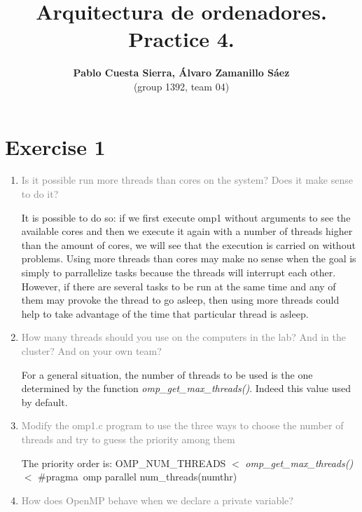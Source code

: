 \documentclass{article}
\begin{document}
\title{\textbf{Arquitectura de ordenadores. Practice 4.}}
\author{\textbf{Pablo Cuesta Sierra, Álvaro Zamanillo Sáez}\\(group 1392, team 04)}
\maketitle

\begin{tcolorbox}
\tableofcontents
\end{tcolorbox}


\newpage
\section{Exercise 1}

\begin{enumerate}
\item \textcolor{gray}{Is it possible run more threads than cores on the system? Does it make sense to do it?}

It is possible to do so: if we first execute omp1 without arguments to see the available cores and then we execute it again with a number of threads higher than the amount of cores, we will see that the execution is carried on without problems. Using more threads than cores may make no sense when the goal is simply to parrallelize tasks because the threads will interrupt each other. However, if there are several tasks to be run at the same time and any of them may provoke the thread to go asleep, then using more threads could help to take advantage of the time that particular thread is asleep. 

\item \textcolor{gray}{How many threads should you use on the computers in the lab? And in the cluster? And on your own team?} 

For a general situation, the number of threads to be used is the one determined by the function \emph{omp\_get\_max\_threads()}. Indeed this value used by default.

\item \textcolor{gray}{Modify the omp1.c program to use the three ways to choose the number of threads and try to guess the priority among them}

The priority order is: \texttt{}{OMP\_NUM\_THREADS} $<$ \emph{omp\_get\_max\_threads()} $<$ \#pragma\ omp parallel num\_threads(numthr) 

\item \textcolor{gray}{How does OpenMP behave when we declare a private variable?}


\end{enumerate}
\end{document}
